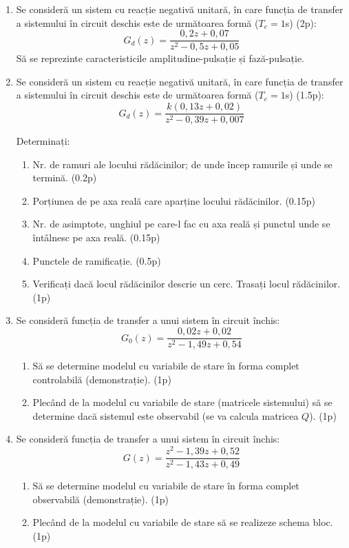 \documentclass[11pt,a4paper]{article}
\begin{document}
\begin{enumerate}[leftmargin=1.4em]
\item Se consideră un sistem cu reacție negativă unitară, în care funcția de transfer a sistemului în circuit deschis este de următoarea formă ($T_e=1$s) (2p):
$$G_d(z)=\frac{0,2z+0,07}{z^2-0,5z+0,05}$$
Să se reprezinte caracteristicile amplitudine-pulsație și fază-pulsație.

\item Se consideră un sistem cu reacție negativă unitară, în care funcția de transfer a sistemului în circuit deschis este de următoarea formă ($T_e=1$s) (1.5p):
$$G_d(z)=\frac{k(0,13z+0,02)}{z^2-0,39z+0,007}$$

Determinați:
\begin{enumerate}[label=\alph*)]
\item Nr. de ramuri ale locului rădăcinilor; de unde încep ramurile și unde se termină. (0.2p)
\item Porțiunea de pe axa reală care aparține locului rădăcinilor. (0.15p)
\item Nr. de asimptote, unghiul pe care-l fac cu axa reală și punctul unde se întâlnesc pe axa reală. (0.15p)
\item Punctele de ramificație. (0.5p)
\item Verificați dacă locul rădăcinilor descrie un cerc. Trasați locul rădăcinilor. (1p)
\end{enumerate}

\item Se consideră funcția de transfer a unui sistem în circuit închis:
$$G_0(z)=\frac{0,02z+0,02}{z^2-1,49z+0,54}$$
\begin{enumerate}[label=\alph*)]
\item Să se determine modelul cu variabile de stare în forma complet controlabilă (demonstrație). (1p)
\item Plecând de la modelul cu variabile de stare (matricele sistemului) să se determine dacă sistemul este observabil (se va calcula matricea $Q$). (1p)
\end{enumerate}

\item Se consideră funcția de transfer a unui sistem în circuit închis:
$$G(z)=\frac{z^2-1,39z+0,52}{z^2-1,43z+0,49}$$
\begin{enumerate}[label=\alph*)]
\item Să se determine modelul cu variabile de stare în forma complet observabilă (demonstrație). (1p)
\item Plecând de la modelul cu variabile de stare să se realizeze schema bloc. (1p)
\end{enumerate}

\end{enumerate}
\end{document}
